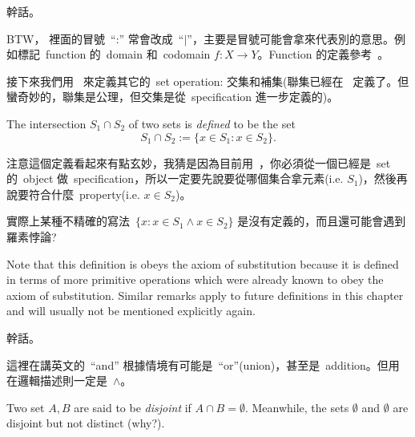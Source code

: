 \begin{example}
幹話。
\end{example}


\begin{note}
BTW， 裡面的冒號\ ``:'' 常會改成\  ``\(\mid\)''，主要是冒號可能會拿來代表別的意思。例如標記\ function 的\ domain 和\ codomain \(f : X \xrightarrow{} Y\)。Function 的定義參考\ 。
\end{note}

\begin{note}
接下來我們用\  來定義其它的\ set operation: 交集和補集(聯集已經在\  定義了。但蠻奇妙的，聯集是公理，但交集是從\ specification 進一步定義的)。
\end{note}

\begin{definition} [Intersections] \label{def 3.1.23}
The intersection \(S_1 \cap S_2 \) of two sets is \emph{defined} to be the set
\[
    S_1 \cap S_2 := \{ x \in S_1 : x \in S_2 \}.
\]
\end{definition}

\begin{note}
注意這個定義看起來有點玄妙，我猜是因為目前用\ ，你必須從一個已經是\ set 的\ object 做\ specification，所以一定要先說要從哪個集合拿元素(i.e. \(S_1\))，然後再說要符合什麼\ property(i.e. \(x \in S_2\))。

實際上某種不精確的寫法\ \( \{ x : x \in S_1 \land x \in S_2 \} \) 是沒有定義的，而且還可能會遇到羅素悖論?
\end{note}

\begin{remark} \label{remark 3.1.24}
Note that this definition is obeys the axiom of substitution  because it is defined in terms of more primitive operations which were already known to obey the axiom of substitution. Similar remarks apply to future definitions in this chapter and will usually not be mentioned explicitly again.
\end{remark}

\begin{example}
幹話。
\end{example}

\begin{remark} \label{remark 3.1.26}
這裡在講英文的\ ``and'' 根據情境有可能是\ ``or''(union)，甚至是\ addition。但用在邏輯描述則一定是\ \(\land\)。
\end{remark}

\begin{note}
Two set \(A, B\) are said to be \emph{disjoint} if \(A \cap B = \emptyset\). Meanwhile, the sets \(\emptyset\) and \(\emptyset\) are disjoint but not distinct (why?).
\end{note}


